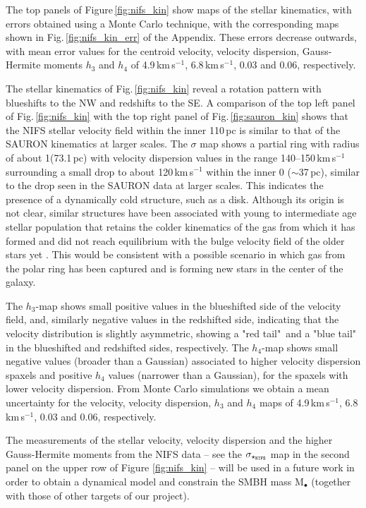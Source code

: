\documentclass[fleqn,usenatbib]{mnras}
\newcommand{\NIFS}{{\tt {NIFS}}}
\begin{document}
The top panels of Figure\,\ref{fig:nifs_kin} show maps of the stellar kinematics, with errors obtained using a Monte Carlo technique, with the corresponding maps shown in  Fig.\,\ref{fig:nifs_kin_err} of the Appendix. These errors decrease outwards, with mean error values for the centroid velocity, velocity dispersion, Gauss-Hermite moments $h_3$ and $h_4$ of 4.9\,km\,s$^{-1}$, 6.8\,km\,s$^{-1}$, 0.03 and 0.06, respectively.

The stellar kinematics of Fig.\,\ref{fig:nifs_kin} reveal a rotation pattern with blueshifts to the NW and redshifts to the SE. A comparison of the top left panel of Fig.\,\ref{fig:nifs_kin} with the top right panel of Fig.\,\ref{fig:sauron_kin} shows that the NIFS stellar velocity field within the inner 110\,pc is similar to that of  the SAURON kinematics at larger scales. The $\sigma$ map shows a partial ring with radius of about 1\arcsec (73.1\,pc) with velocity dispersion values in the range 140--150\,km\,s$^{-1}$ surrounding a small drop to about 120\,km\,s$^{-1}$ within the inner 0 ($\sim$37\,pc), similar to the drop seen in the SAURON data at larger scales. This indicates the presence of a dynamically cold structure, such as a disk. Although its origin is not  clear, similar structures have been associated with young to intermediate age stellar population that retains the colder kinematics of the gas from which it has formed and did not reach equilibrium with the bulge velocity field of the older stars yet \citep{riffel_intermediate-age_2010, riffel_intermediate-age_2011}. This would be consistent with a possible scenario in which gas from the polar ring has been captured and is forming new stars in the center of the galaxy.

 The $h_3$-map shows small positive values in the blueshifted side of the velocity field, and, similarly negative values in the redshifted side, indicating that the velocity distribution is slightly asymmetric, showing a "red tail"\, and a "blue tail"\,in the blueshifted and redshifted sides, respectively. The $h_4$-map shows small negative values (broader than a Gaussian) associated to higher velocity dispersion spaxels and positive $h_4$ values (narrower than a Gaussian), for the spaxels with lower velocity dispersion. From Monte Carlo simulations we obtain a mean uncertainty for the velocity, velocity dispersion, $h_3$ and $h_4$ maps of 4.9\,km\,s$^{-1}$, 6.8\,km\,s$^{-1}$, 0.03 and 0.06, respectively.

The measurements of the stellar velocity, velocity dispersion and the higher Gauss-Hermite moments from the NIFS data -- see the $\sigma_{\star_{\NIFS}}$ map in the second panel on the upper row of Figure \ref{fig:nifs_kin} -- will be used in a future work in order to obtain a dynamical model and constrain the SMBH mass M$_\bullet$ (together with those of other targets of our project).
\end{document}
